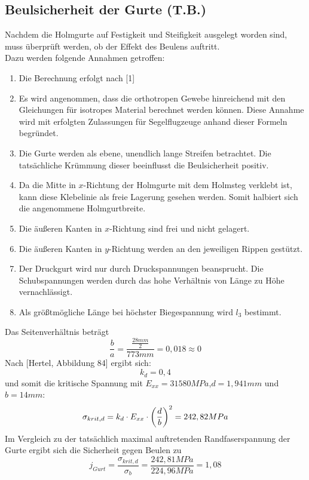 \subsection{Beulsicherheit der Gurte (T.B.)}
Nachdem die Holmgurte auf Festigkeit und Steifigkeit ausgelegt worden sind, muss überprüft werden, ob der Effekt des Beulens auftritt.\\

\noindent Dazu werden folgende Annahmen getroffen:

\begin{enumerate}
	\item Die Berechnung erfolgt nach [1]
	\item Es wird angenommen, dass die orthotropen Gewebe hinreichend mit den Gleichungen für isotropes Material berechnet werden können. Diese Annahme wird mit erfolgten Zulassungen für Segelflugzeuge anhand dieser Formeln begründet.
	\item Die Gurte werden als ebene, unendlich lange Streifen betrachtet. Die tatsächliche Krümmung dieser beeinflusst die Beulsicherheit positiv.
	\item Da die Mitte in $x$-Richtung der Holmgurte mit dem Holmsteg verklebt ist, kann diese Klebelinie als freie Lagerung gesehen werden. Somit halbiert sich die angenommene Holmgurtbreite.
	\item Die äußeren Kanten in $x$-Richtung sind frei und nicht gelagert.
	\item Die äußeren Kanten in $y$-Richtung werden an den jeweiligen Rippen gestützt.
	\item Der Druckgurt wird nur durch Druckspannungen beansprucht. Die Schubspannungen werden durch das hohe Verhältnis von Länge zu  Höhe vernachlässigt.
	\item Als größtmögliche Länge bei höchster Biegespannung wird $l_{3}$ bestimmt.
\end{enumerate}
Das Seitenverhältnis beträgt 
\begin{equation}
	\frac{b}{a}=\frac{\frac{28 mm}{2}}{773 mm}=0,018 \approx 0
\end{equation}
\noindent Nach [Hertel, Abbildung 84] ergibt sich:
\begin{equation}
	k_{d}=0,4
\end{equation}
und somit die kritische Spannung mit $E_{xx}=31580MPa$,$d=1,941mm$ und $b=14mm$:
\begin{equation}
	\sigma_{krit,d}=k_{d}\cdot E_{xx}\cdot\biggl(\frac{d}{b}\biggr)^{2}\\
	= 242,82 MPa
\end{equation}
Im Vergleich zu der tatsächlich maximal auftretenden Randfaserspannung der Gurte ergibt sich die Sicherheit gegen Beulen zu 
\begin{equation}
	j_{Gurt}=\frac{\sigma_{krit,d}}{\sigma_{b}}=\frac{242,81 MPa}{224,96 MPa}=1,08
\end{equation}


